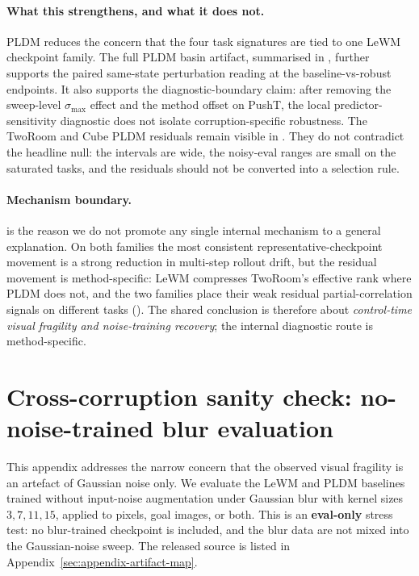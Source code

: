 \documentclass[10pt]{article}
\newcommand{\stdmax}{\ensuremath{\sigma_{\max}}}
\begin{document}
\paragraph{What this strengthens, and what it does not.} PLDM reduces the concern that the four task signatures are tied to one LeWM checkpoint family. The full PLDM basin artifact, summarised in , further supports the paired same-state perturbation reading at the baseline-vs-robust endpoints. It also supports the diagnostic-boundary claim: after removing the sweep-level \stdmax{} effect and the method offset on PushT, the local predictor-sensitivity diagnostic does not isolate corruption-specific robustness. The TwoRoom and Cube PLDM residuals remain visible in . They do not contradict the headline null: the intervals are wide, the noisy-eval ranges are small on the saturated tasks, and the residuals should not be converted into a selection rule.

\paragraph{Mechanism boundary.}  is the reason we do not promote any single internal mechanism to a general explanation. On both families the most consistent representative-checkpoint movement is a strong reduction in multi-step rollout drift, but the residual movement is method-specific: LeWM compresses TwoRoom's effective rank where PLDM does not, and the two families place their weak residual partial-correlation signals on different tasks (). The shared conclusion is therefore about \emph{control-time visual fragility and noise-training recovery}; the internal diagnostic route is method-specific.

\section{Cross-corruption sanity check: no-noise-trained blur evaluation}\label{sec:appendix-blur}

This appendix addresses the narrow concern that the observed visual fragility is an artefact of Gaussian noise only. We evaluate the LeWM and PLDM baselines trained without input-noise augmentation under Gaussian blur with kernel sizes $3, 7, 11, 15$, applied to pixels, goal images, or both. This is an \textbf{eval-only} stress test: no blur-trained checkpoint is included, and the blur data are not mixed into the Gaussian-noise sweep. The released source is listed in Appendix~\ref{sec:appendix-artifact-map}.
\end{document}
